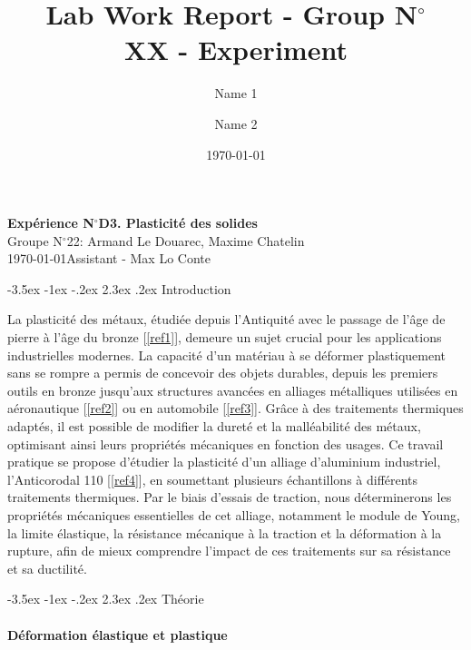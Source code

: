 \documentclass[a4paper, 12pt,oneside]{article}
\makeatletter
\renewcommand{\section}{\@startsection {section}{1}{\z@}%
             {-3.5ex \@plus -1ex \@minus -.2ex}%
             {2.3ex \@plus.2ex}%
             {\normalfont\normalsize\bfseries}}
\makeatother
\begin{document}
\title{\normalsize{Lab Work Report - Group N$^\circ$\\ XX - Experiment}}
\date{\normalsize{\today}}
\author{\normalsize{Name} 1\and \normalsize{Name 2}}

\begin{center}
\large\textbf{\sffamily Expérience N$^\circ$D3. Plasticité des solides}\\%
\large\sffamily Groupe N$^\circ$22: Armand Le Douarec, Maxime Chatelin\\%
\large\sffamily\today\quad   Assistant -  Max Lo Conte \\%
\end{center}

\section{Introduction}
\vspace{-0.2cm}

La plasticité des métaux, étudiée depuis l’Antiquité avec le passage de l’âge de pierre à l’âge du bronze [\ref{ref1}], demeure un sujet crucial pour les applications industrielles modernes. La capacité d’un matériau à se déformer plastiquement sans se rompre a permis de concevoir des objets durables, depuis les premiers outils en bronze jusqu’aux structures avancées en alliages métalliques utilisées en aéronautique [\ref{ref2}] ou en automobile [\ref{ref3}]. Grâce à des traitements thermiques adaptés, il est possible de modifier la dureté et la malléabilité des métaux, optimisant ainsi leurs propriétés mécaniques en fonction des usages. Ce travail pratique se propose d’étudier la plasticité d’un alliage d’aluminium industriel, l’Anticorodal 110 [\ref{ref4}], en soumettant plusieurs échantillons à différents traitements thermiques. Par le biais d’essais de traction, nous déterminerons les propriétés mécaniques essentielles de cet alliage, notamment le module de Young, la limite élastique, la résistance mécanique à la traction et la déformation à la rupture, afin de mieux comprendre l’impact de ces traitements sur sa résistance et sa ductilité.

\vspace{-0.2cm}
\section{Théorie}
\vspace{-0.2cm}

\paragraph{Déformation élastique et plastique}
\end{document}
